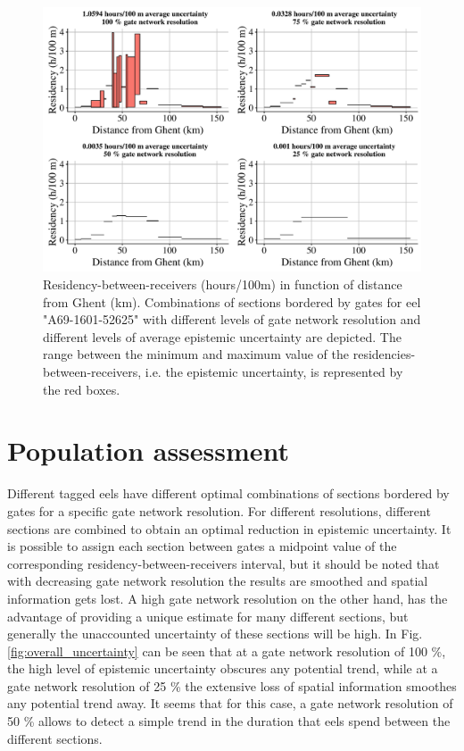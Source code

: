 \begin{figure}[h!]
  \centering\includegraphics[scale=0.45]{Resistance_model2_jb_eel3.pdf}
  \caption{Residency-between-receivers (hours/100m) in function of distance from Ghent (km). Combinations of sections bordered by gates for eel "A69-1601-52625" with different levels of gate network resolution and different levels of average epistemic uncertainty are depicted. The range between the minimum and maximum value of the residencies-between-receivers, i.e. the epistemic uncertainty, is represented by the red boxes.}
  \label{fig:Resistance_model3}
\end{figure}

\FloatBarrier

\section{Population assessment}
\label{Fig}

\setcounter{table}{0} \renewcommand{\thetable}{E.\arabic{table}}
\setcounter{figure}{0} \renewcommand{\thefigure}{E.\arabic{figure}}

Different tagged eels have different optimal combinations of sections bordered by gates for a specific gate network resolution. For different resolutions, different sections are combined to obtain an optimal reduction in epistemic uncertainty. It is possible to assign each section between gates a midpoint value of the corresponding residency-between-receivers interval, but it should be noted that with decreasing gate network resolution the results are smoothed and spatial information gets lost. A high gate network resolution on the other hand, has the advantage of providing a unique estimate for many different sections, but generally the unaccounted uncertainty of these sections will be high. In Fig. \ref{fig:overall_uncertainty} can be seen that at a gate network resolution of 100 \%, the high level of epistemic uncertainty obscures any potential trend, while at a gate network resolution of 25 \% the extensive loss of spatial information smoothes any potential trend away. It seems that for this case, a gate network resolution of 50 \% allows to detect a simple trend in the duration that eels spend between the different sections.  

